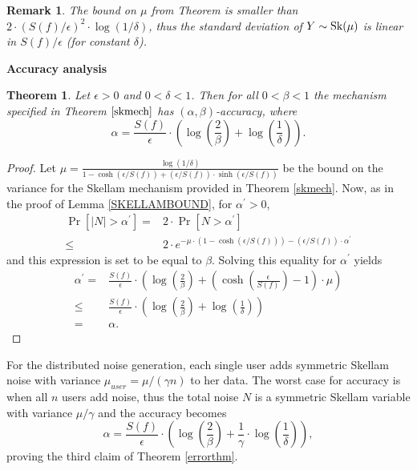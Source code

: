 \documentclass[10pt]{extarticle}
\newtheorem{Thm}{Theorem}
\newtheorem{Rem}{Remark}
\begin{document}
\begin{Rem} The bound on $\mu$ from Theorem \text{\upshape \ref{skmech}} is smaller than $2\cdot (S(f)/\epsilon)^2\cdot\log(1/\delta)$, thus the standard deviation of $Y\sim\text{\upshape Sk}(\mu)$ is linear in $S(f)/\epsilon$ (for constant $\delta$).
\end{Rem}\par\bigskip\bigskip

\noindent\textbf{Accuracy analysis}

\begin{Thm}\label{erroranalysis} Let $\epsilon>0$ and $0<\delta<1$. Then for all $0<\beta<1$ the mechanism specified in Theorem $\ref{skmech}$ has $(\alpha,\beta)$-accuracy, where
\[\alpha=\frac{S(f)}{\epsilon}\cdot\left(\log\left(\frac{2}{\beta}\right)+\log\left(\frac{1}{\delta}\right)\right).\]
\end{Thm}
\begin{proof} Let $\mu=\frac{\log(1/\delta)}{1-\cosh(\epsilon/S(f))+(\epsilon/S(f))\cdot\sinh(\epsilon/S(f))}$ be the bound on the variance for the Skellam mechanism provided in Theorem \ref{skmech}. Now, as in the proof of Lemma \ref{SKELLAMBOUND}, for $\alpha^\prime>0$,
\begin{align*} \Pr[|N|>\alpha^\prime]= & 2\cdot\Pr[N>\alpha^\prime]\\
\leq & 2\cdot e^{-\mu\cdot(1-\cosh(\epsilon/S(f)))-(\epsilon/S(f))\cdot\alpha^\prime}
\end{align*}
and this expression is set to be equal to $\beta$. Solving this equality for $\alpha^\prime$ yields
\begin{align*} \alpha^\prime= & \frac{S(f)}{\epsilon}\cdot\left(\log\left(\frac{2}{\beta}\right)+\left(\cosh\left(\frac{\epsilon}{S(f)}\right)-1\right)\cdot\mu\right)\\
 \leq & \frac{S(f)}{\epsilon}\cdot\left(\log\left(\frac{2}{\beta}\right)+\log\left(\frac{1}{\delta}\right)\right)\\
= & \alpha.
\end{align*}
\end{proof}\par\medskip

\noindent For the distributed noise generation, each single user adds symmetric Skellam noise with variance $\mu_{user}=\mu/(\gamma n)$ to her data. The worst case for accuracy is when all $n$ users add noise, thus the total noise $N$ is a symmetric Skellam variable with variance $\mu/\gamma$ and the accuracy becomes
\[\alpha=\frac{S(f)}{\epsilon}\cdot\left(\log\left(\frac{2}{\beta}\right)+\frac{1}{\gamma}\cdot\log\left(\frac{1}{\delta}\right)\right),\]
proving the third claim of Theorem \ref{errorthm}.



\end{document}
